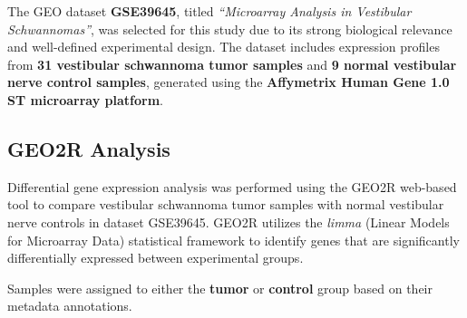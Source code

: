 \documentclass[11pt]{article}
\begin{document}
The GEO dataset \textbf{GSE39645}, titled \textit{``Microarray Analysis in Vestibular Schwannomas''}, was selected for this study due to its strong biological relevance and well-defined experimental design. The dataset includes expression profiles from \textbf{31 vestibular schwannoma tumor samples} and \textbf{9 normal vestibular nerve control samples}, generated using the \textbf{Affymetrix Human Gene 1.0 ST microarray platform}.

\subsection{GEO2R Analysis}

Differential gene expression analysis was performed using the GEO2R web-based tool to compare vestibular schwannoma tumor samples with normal vestibular nerve controls in dataset GSE39645. GEO2R utilizes the \textit{limma} (Linear Models for Microarray Data) statistical framework to identify genes that are significantly differentially expressed between experimental groups.

Samples were assigned to either the \textbf{tumor} or \textbf{control} group based on their metadata annotations.
\end{document}
